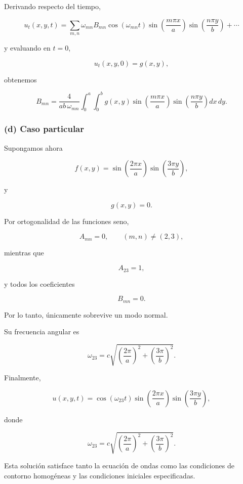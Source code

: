 \documentclass[11pt,spanish]{article}
\begin{document}
Derivando respecto del tiempo,

\[
u_t(x,y,t)
=
\sum_{m,n}
\omega_{mn}
B_{mn}
\cos(\omega_{mn}t)
\sin\!\left(\frac{m\pi x}{a}\right)
\sin\!\left(\frac{n\pi y}{b}\right)
+\cdots
\]

y evaluando en $t=0$,

\[
u_t(x,y,0)=g(x,y),
\]

obtenemos

\begin{equation}
B_{mn}
=
\frac{4}
{ab\,\omega_{mn}}
\int_0^a
\int_0^b
g(x,y)
\sin\!\left(\frac{m\pi x}{a}\right)
\sin\!\left(\frac{n\pi y}{b}\right)
dx\,dy.
\end{equation}

\subsubsection*{(d) Caso particular}

Supongamos ahora

\begin{equation}
f(x,y)
=
\sin\!\left(\frac{2\pi x}{a}\right)
\sin\!\left(\frac{3\pi y}{b}\right),
\end{equation}

y

\[
g(x,y)=0.
\]

Por ortogonalidad de las funciones seno,

\[
A_{mn}=0,
\qquad
(m,n)\neq(2,3),
\]

mientras que

\[
A_{23}=1,
\]

y todos los coeficientes

\[
B_{mn}=0.
\]

Por lo tanto, únicamente sobrevive un modo normal.

Su frecuencia angular es

\begin{equation}
\omega_{23}
=
c
\sqrt{
\left(\frac{2\pi}{a}\right)^2
+
\left(\frac{3\pi}{b}\right)^2
}.
\end{equation}

Finalmente,

\begin{equation}
\boxed{
u(x,y,t)
=
\cos(\omega_{23}t)
\sin\!\left(\frac{2\pi x}{a}\right)
\sin\!\left(\frac{3\pi y}{b}\right),
}
\end{equation}

donde

\begin{equation}
\boxed{
\omega_{23}
=
c
\sqrt{
\left(\frac{2\pi}{a}\right)^2
+
\left(\frac{3\pi}{b}\right)^2
}.
}
\end{equation}

Esta solución satisface tanto la ecuación de ondas como las condiciones de contorno homogéneas y las condiciones iniciales especificadas.














 
 
\end{document}
